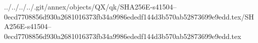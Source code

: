 ../../../../.git/annex/objects/QX/qk/SHA256E-s41504--0ecd7708856d930a2681016373fb34a9986ededf144d3b570ab52873699e9edd.tex/SHA256E-s41504--0ecd7708856d930a2681016373fb34a9986ededf144d3b570ab52873699e9edd.tex